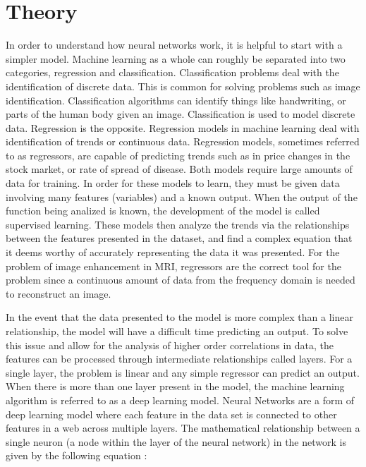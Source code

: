 \documentclass[14pt]{extreport}
\begin{document}
    \section*{Theory}
        In order to understand how neural networks work, it is helpful to start with a simpler model. Machine learning as a whole can roughly be separated into two categories, regression and classification. Classification problems deal with the identification of discrete data. This is common for solving problems such as image identification. Classification algorithms can identify things like handwriting, or parts of the human body given an image. Classification is used to model discrete data. Regression is the opposite. Regression models in machine learning deal with identification of trends or continuous data. Regression models, sometimes referred to as regressors, are capable of predicting trends such as in price changes in the stock market, or rate of spread of disease. Both models require large amounts of data for training. In order for these models to learn, they must be given data involving many features (variables) and a known output. When the output of the function being analized is known, the development of the model is called supervised learning. These models then analyze the trends via the relationships between the features presented in the dataset, and find a complex equation that it deems worthy of accurately representing the data it was presented. For the problem of image enhancement in MRI, regressors are the correct tool for the problem since a continuous amount of data from the frequency domain is needed to reconstruct an image. 

        In the event that the data presented to the model is more complex than a linear relationship, the model will have a difficult time predicting an output\cite{Raschka_2022}. To solve this issue and allow for the analysis of higher order correlations in data, the features can be processed through intermediate relationships called layers. For a single layer, the problem is linear and any simple regressor can predict an output. When there is more than one layer present in the model, the machine learning algorithm is referred to as a deep learning model. Neural Networks are a form of deep learning model where each feature in the data set is connected to other features in a web across multiple layers. The mathematical relationship between a single neuron (a node within the layer of the neural network) in the network is given by the following equation \cite{Gazit_2024}:
        
\end{document}
